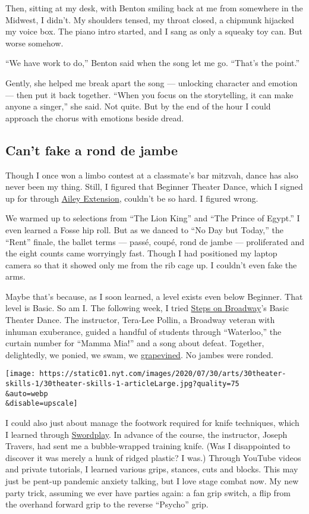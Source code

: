 Then, sitting at my desk, with Benton smiling back at me from somewhere
in the Midwest, I didn't. My shoulders tensed, my throat closed, a
chipmunk hijacked my voice box. The piano intro started, and I sang as
only a squeaky toy can. But worse somehow.

``We have work to do,'' Benton said when the song let me go. ``That's
the point.''

Gently, she helped me break apart the song --- unlocking character and
emotion --- then put it back together. ``When you focus on the
storytelling, it can make anyone a singer,'' she said. Not quite. But by
the end of the hour I could approach the chorus with emotions beside
dread.

\hypertarget{cant-fake-a-rond-de-jambe}{%
\subsection{Can't fake a rond de
jambe}\label{cant-fake-a-rond-de-jambe}}

Though I once won a limbo contest at a classmate's bar mitzvah, dance
has also never been my thing. Still, I figured that Beginner Theater
Dance, which I signed up for through
\href{https://www.aileyextension.com/}{Ailey Extension}, couldn't be so
hard. I figured wrong.

We warmed up to selections from ``The Lion King'' and ``The Prince of
Egypt.'' I even learned a Fosse hip roll. But as we danced to ``No Day
but Today,'' the ``Rent'' finale, the ballet terms --- passé, coupé,
rond de jambe --- proliferated and the eight counts came worryingly
fast. Though I had positioned my laptop camera so that it showed only me
from the rib cage up. I couldn't even fake the arms.

Maybe that's because, as I soon learned, a level exists even below
Beginner. That level is Basic. So am I. The following week, I tried
\href{https://www.stepsnyc.com/}{Steps on Broadway}'s Basic Theater
Dance. The instructor, Tera-Lee Pollin, a Broadway veteran with inhuman
exuberance, guided a handful of students through ``Waterloo,'' the
curtain number for ``Mamma Mia!'' and a song about defeat. Together,
delightedly, we ponied, we swam, we
\href{https://www.youtube.com/watch?v=1BESmZUXIJs}{grapevined}. No
jambes were ronded.

\texttt{[image: https://static01.nyt.com/images/2020/07/30/arts/30theater-skills-1/30theater-skills-1-articleLarge.jpg?quality=75\\\&auto=webp\\\&disable=upscale]}

I could also just about manage the footwork required for knife
techniques, which I learned through
\href{http://www.swordplaystagecombat.com/}{Swordplay}. In advance of
the course, the instructor, Joseph Travers, had sent me a bubble-wrapped
training knife. (Was I disappointed to discover it was merely a hunk of
ridged plastic? I was.) Through YouTube videos and private tutorials, I
learned various grips, stances, cuts and blocks. This may just be
pent-up pandemic anxiety talking, but I love stage combat now. My new
party trick, assuming we ever have parties again: a fan grip switch, a
flip from the overhand forward grip to the reverse ``Psycho'' grip.

